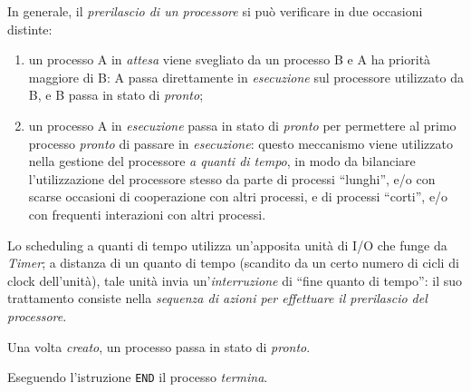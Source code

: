 In generale, il \textit{prerilascio di un processore} si può verificare in due occasioni distinte:
\begin{enumerate}
    \item un processo A in \textit{attesa} viene svegliato da un processo B e A ha priorità maggiore di B: A passa direttamente in \textit{esecuzione} sul processore utilizzato da B, e B passa in stato di \textit{pronto};
    \item un processo A in \textit{esecuzione} passa in stato di \textit{pronto} per permettere al primo processo \textit{pronto} di passare in \textit{esecuzione}: questo meccanismo viene utilizzato nella gestione del processore \textit{a quanti di tempo}, in modo da bilanciare l'utilizzazione del processore stesso da parte di processi ``lunghi'', e/o con scarse occasioni di cooperazione con altri processi, e di processi ``corti'', e/o con frequenti
          interazioni con altri processi.
\end{enumerate}

\noindent Lo scheduling a quanti di tempo utilizza un'apposita unità di I/O che funge da \textit{Timer}; a distanza di un quanto di tempo (scandito da un certo numero di cicli di clock dell'unità), tale unità invia un'\textit{interruzione} di ``fine quanto di tempo'': il suo trattamento consiste nella \textit{sequenza di azioni per effettuare il prerilascio del processore}.

Una volta \textit{creato}, un processo passa in stato di \textit{pronto}.

Eseguendo l'istruzione \texttt{END} il processo \textit{termina}.

